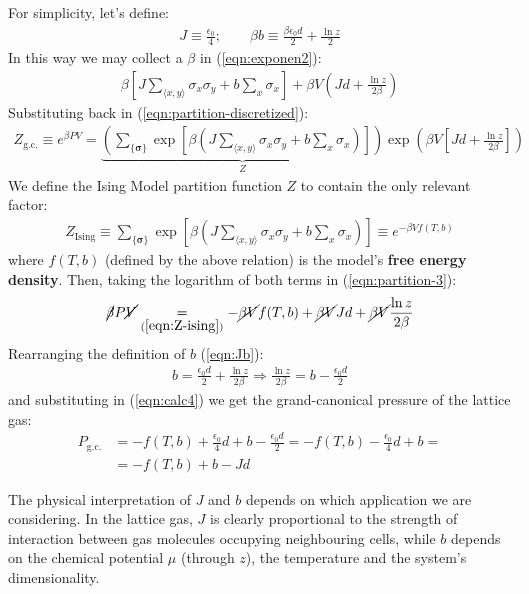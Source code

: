 \documentclass[../template.tex]{subfiles}
\begin{document}
For simplicity, let's define:
\begin{align}\label{eqn:Jb}
    J \equiv \frac{\epsilon_0}{4}; \qquad \beta b \equiv \frac{\beta \epsilon_0 d}{2} + \frac{\ln z}{2}   
\end{align}
In this way we may collect a $\beta$ in (\ref{eqn:exponen2}):
\begin{align*}
    \beta \left[J \sum_{\langle x,y \rangle} \sigma_x \sigma_y + b \sum_x \sigma_x\right] + \beta V \left(J d + \frac{\ln z}{2 \beta} \right)
\end{align*}
Substituting back in (\ref{eqn:partition-discretized}):
\begin{align}\label{eqn:partition-3}
    Z_{\mathrm{g.c.}} \equiv e^{\beta PV} =\underbrace{ \left(\sum_{\{\bm{\sigma}\}} \exp\left[\beta \left(J \sum_{\langle x,y \rangle} \sigma_x \sigma_y + b \sum_x \sigma_x\right)\right] \right)}_{Z} \exp\left(\beta V \left[Jd + \frac{\ln z}{2 \beta} \right]\right)
\end{align}
We define the Ising Model partition function $Z$ to contain the only relevant factor:
\begin{align} \label{eqn:Z-ising}
    Z_{\mathrm{Ising}} \equiv \sum_{\{\bm{\sigma}\}} \exp\left[\beta \left(J \sum_{\langle x,y \rangle} \sigma_x \sigma_y + b \sum_x \sigma_x\right)\right] \equiv e^{-\beta V f(T,b)}
\end{align}
where $f(T,b)$ (defined by the above relation) is the model's \textbf{free energy density}. Then, taking the logarithm of both terms in (\ref{eqn:partition-3}):
\begin{align}\label{eqn:calc4}
    \cancel{\beta }P \cancel{V} \underset{(\ref{eqn:Z-ising})}{=}  -\cancel{\beta V} f(T,b) +\cancel{ \beta V} J d + \cancel{\beta V} \frac{\ln z}{2 \beta} 
\end{align}
Rearranging the definition of $b$ (\ref{eqn:Jb}):
\begin{align*}
    b = \frac{\epsilon_0 d}{2} + \frac{\ln z}{2 \beta} \Rightarrow \frac{\ln z}{2 \beta} = b - \frac{\epsilon_0 d}{2}    
\end{align*}
and substituting in (\ref{eqn:calc4}) we get the grand-canonical pressure of the lattice gas:
\begin{align}\nonumber
    P_{\mathrm{g.c.}} &= -f(T,b) + \frac{\epsilon_0}{4} d + b - \frac{\epsilon_0 d}{2} = -f(T,b) -\frac{\epsilon_0}{4} d + b =\\
    &= -f(T,b) +b - Jd   \label{eqn:Pgc}
\end{align}

The physical interpretation of $J$ and $b$ depends on which application we are considering. In the lattice gas, $J$ is clearly proportional to the strength of interaction between gas molecules occupying neighbouring cells, while $b$ depends on the chemical potential $\mu$ (through $z$), the temperature and the system's dimensionality. 
\end{document}
